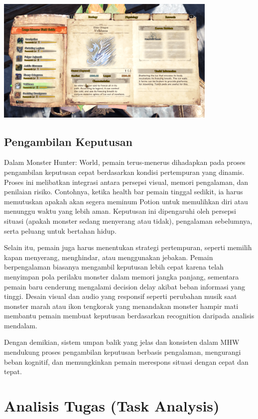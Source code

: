 \documentclass[12pt]{article}
\begin{document}
\begin{center}
    \includegraphics[width=0.8\textwidth]{Image/Hunters_Note.png}
\end{center}


\subsection{Pengambilan Keputusan}
Dalam Monster Hunter: World, pemain terus-menerus dihadapkan pada proses pengambilan keputusan cepat berdasarkan kondisi pertempuran yang dinamis. Proses ini melibatkan integrasi antara persepsi visual, memori pengalaman, dan penilaian risiko. Contohnya, ketika health bar pemain tinggal sedikit, ia harus memutuskan apakah akan segera meminum Potion untuk memulihkan diri atau menunggu waktu yang lebih aman. Keputusan ini dipengaruhi oleh persepsi situasi (apakah monster sedang menyerang atau tidak), pengalaman sebelumnya, serta peluang untuk bertahan hidup.

Selain itu, pemain juga harus menentukan strategi pertempuran, seperti memilih kapan menyerang, menghindar, atau menggunakan jebakan. Pemain berpengalaman biasanya mengambil keputusan lebih cepat karena telah menyimpan pola perilaku monster dalam memori jangka panjang, sementara pemain baru cenderung mengalami decision delay akibat beban informasi yang tinggi. Desain visual dan audio yang responsif seperti perubahan musik saat monster marah atau ikon tengkorak yang menandakan monster hampir mati membantu pemain membuat keputusan berdasarkan recognition daripada analisis mendalam.

Dengan demikian, sistem umpan balik yang jelas dan konsisten dalam MHW mendukung proses pengambilan keputusan berbasis pengalaman, mengurangi beban kognitif, dan memungkinkan pemain merespons situasi dengan cepat dan tepat.

\section{Analisis Tugas (Task Analysis)}
\end{document}
